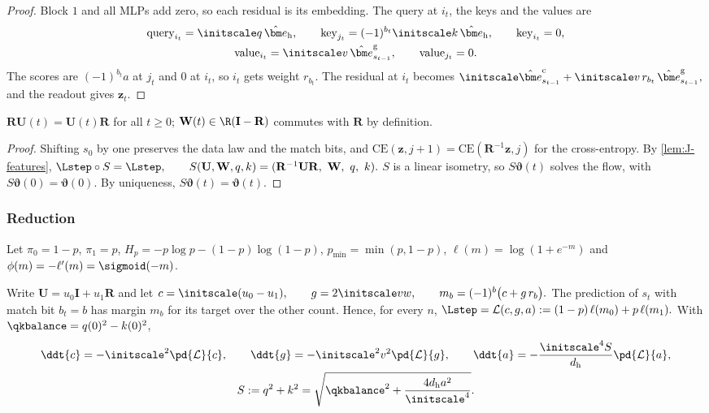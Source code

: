 \begin{proof}
Block $1$ and all MLPs add zero, so each residual is its embedding. The query at $i_t$, the keys and the values are
\begin{gather*}
 \text{query}_{i_t}=\initscale q\,\hat{\bm e}_{\mathrm h},\qquad \text{key}_{j_t}=(-1)^{b_t}\initscale k\,\hat{\bm e}_{\mathrm h},\qquad \text{key}_{i_t}=0,\\
 \text{value}_{i_t}=\initscale v\,\hat{\bm e}^{\mathrm g}_{s_{t-1}},\qquad \text{value}_{j_t}=0 .
\end{gather*}
The scores are $(-1)^{b_t}a$ at $j_t$ and $0$ at $i_t$, so $i_t$ gets weight $r_{b_t}$. The residual at $i_t$ becomes
 $\initscale\hat{\bm e}^{\mathrm c}_{s_{t-1}}+\initscale v\,r_{b_t}\,\hat{\bm e}^{\mathrm g}_{s_{t-1}},$ 
and the readout gives $\bm z_t$.
\end{proof}

\begin{lemma}
\label{lem:J-symmetry}
$\mathbf R\mathbf U(t)=\mathbf U(t)\mathbf R$ for all $t\ge0$; $\mathbf W(t)\in\R(\mathbf I-\mathbf R)$ commutes with $\mathbf R$ by definition.
\end{lemma}

\begin{proof}
Shifting $s_0$ by one preserves the data law and the match bits, and $\mathrm{CE}(\bm z,j+1)=\mathrm{CE}(\mathbf R^{-1}\bm z,j)$ for the cross-entropy. By \cref{lem:J-features},
 $\Lstep\circ S=\Lstep,\qquad S(\mathbf U,\mathbf W,q,k)=(\mathbf R^{-1}\mathbf U\mathbf R,\ \mathbf W,\ q,\ k).$ 
$S$ is a linear isometry, so $S\bm\vartheta(t)$ solves the flow, with $S\bm\vartheta(0)=\bm\vartheta(0)$. By uniqueness, $S\bm\vartheta(t)=\bm\vartheta(t)$.
\end{proof}

\subsubsection{Reduction}

Let $\pi_0=1-p$, $\pi_1=p$, $H_p=-p\log p-(1-p)\log(1-p)$, $p_{\min}=\min(p,1-p)$, $\ell(m)=\log(1+e^{-m})$ and
$\phi(m)=-\ell'(m)=\sigmoid(-m)$.

\begin{lemma}
\label{lem:J-reduce}
Write $\mathbf U=u_0\mathbf I+u_1\mathbf R$ and let
 $c=\initscale(u_0-u_1),\qquad g=2\initscale vw,\qquad m_b=(-1)^b\bigl(c+g\,r_b\bigr).$ 
The prediction of $s_t$ with match bit $b_t=b$ has margin $m_b$ for its target over the other count. Hence, for every $n$,
 $\Lstep=\mathcal L(c,g,a):=(1-p)\,\ell(m_0)+p\,\ell(m_1).$ 
With $\qkbalance=q(0)^2-k(0)^2$,
\begin{equation}
 \begin{gathered}
 \ddt{c}=-\initscale^2\pd{\mathcal L}{c},\qquad \ddt{g}=-\initscale^2v^2\pd{\mathcal L}{g},\qquad \ddt{a}=-\frac{\initscale^4S}{d_{\mathrm h}}\pd{\mathcal L}{a},\\
 S:=q^2+k^2=\sqrt{\qkbalance^2+\frac{4d_{\mathrm h}a^2}{\initscale^4}}.
 \end{gathered}
 \label{eq:J-flow}
\end{equation}
\end{lemma}

